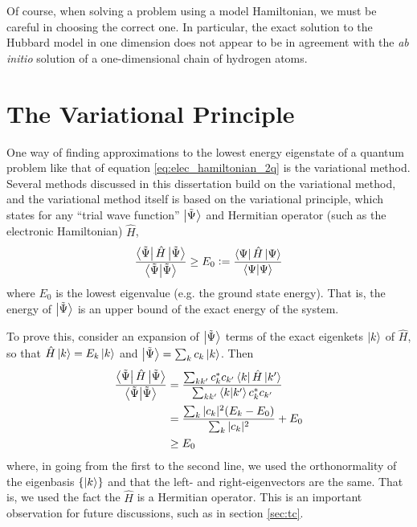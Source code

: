 Of course, when solving a problem using a model Hamiltonian, we must be careful in choosing the correct one. In particular, the exact solution to the Hubbard model in one dimension\cite{Lieb1968a} does not appear to be in agreement with the \emph{ab initio} solution of a one-dimensional chain of hydrogen atoms.\cite{Motta2017,Motta2020}

\section{The Variational Principle}
\label{sec:variational_principle}

One way of finding approximations to the lowest energy eigenstate of a quantum problem like that of equation \eqref{eq:elec_hamiltonian_2q} is the variational method. Several methods discussed in this dissertation build on the variational method, and the variational method itself is based on the variational principle, which states\cite{sakuraiModern2017} for any ``trial wave function'' $\ket{\tilde\Psi}$ and Hermitian operator (such as the electronic Hamiltonian) $\hat H$,
\begin{equation}
    \label{eq:variational_principle}
    \frac{\bra{\tilde\Psi}\hat H\ket{\tilde\Psi}}{\braket{\tilde\Psi}}
    \ge E_0 \mathrel{\mathop:}=  \frac{\bra{\Psi}\hat H\ket{\Psi}}{\braket{\Psi}}
\end{equation}
where $E_0$ is the lowest eigenvalue (e.g. the ground state energy). That is, the energy of $\ket{\tilde\Psi}$ is an upper bound of the exact energy of the system.

To prove this, consider an expansion of $\ket{\tilde\Psi}$ terms of the exact eigenkets $\ket k$ of $\hat H$, so that $\hat H\ket k = E_k\ket k$ and $\ket{\tilde\Psi}=\sum_kc_k\ket k$. Then
\begin{align}
\label{eq:var_proof}
    \begin{split}
    \frac{\bra{\tilde\Psi}\hat H\ket{\tilde\Psi}}{\braket{\tilde\Psi}}
    &=
    \frac{\sum_{kk'}c_k^*c_{k'}\bra{k}\hat H\ket{k'}}{\sum_{kk'}\bra{k}\ket{k'}c_k^*c_{k'}}\\
    &= \frac{\sum_k|c_k|^2(E_k-E_0)}{\sum_k|c_k|^2} + E_0 \\
    &\ge E_0
\end{split}
\end{align}
where, in going from the first to the second line, we used the orthonormality of the eigenbasis $\{\ket k\}$ and that the left- and right-eigenvectors are the same. That is, we used the fact the $\hat H$ is a Hermitian operator. This is an important observation for future discussions, such as in section \ref{sec:tc}.

